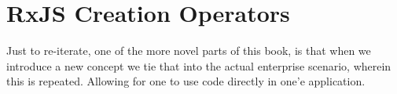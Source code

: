 \chapter{RxJS Creation Operators}
Just to re-iterate, one of the more novel parts of this book, is that when we 
introduce a new concept we tie that into the actual enterprise scenario, 
wherein this is repeated. Allowing for one to use code directly in one'e 
application. 

